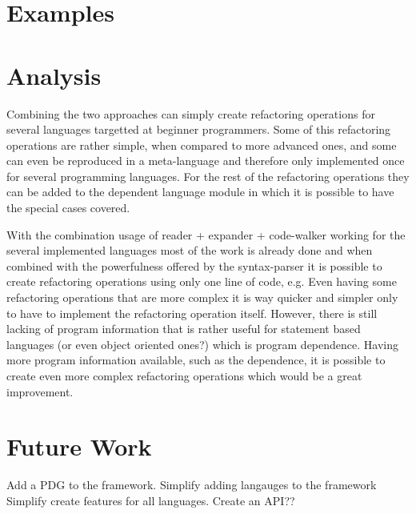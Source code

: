 \section{Examples}  %

\section{Analysis} %
Combining the two approaches can simply create refactoring operations for several
languages targetted at beginner programmers. Some of this refactoring operations
are rather simple, when compared to more advanced ones, and some can even be reproduced
in a meta-language and therefore only implemented once for several programming languages.
For the rest of the refactoring operations they can be added to the dependent language
module in which it is possible to have the special cases covered.

With the combination usage of reader + expander + code-walker working for the several
implemented languages most of the work is already done and when combined with the
powerfulness offered by the syntax-parser it is possible to create refactoring operations
using only one line of code, e.g. %
Even having some refactoring operations that are more complex it is way quicker and
simpler only to have to implement the refactoring operation itself.
However, there is still lacking of program information that is rather useful for
statement based languages (or even object oriented ones?) which is program dependence.
Having more program information available, such as the dependence, it is possible to
create even more complex refactoring operations which would be a great improvement.



\section{Future Work}
Add a PDG to the framework.
Simplify adding langauges to the framework
Simplify create features for all languages.
Create an API??
